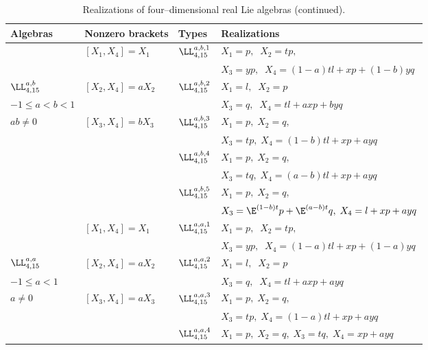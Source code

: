 \setcounter{table}{1}
\begin{table}
\label{t7}
\caption{Realizations of four--dimensional real Lie algebras (continued).}
\begin{center}
\begin{tabular}{|l|l|l|l|}
\hline
Algebras & Nonzero brackets & Types & Realizations\\
\hline
& $[X_1,X_4]=X_1$& $\LL_{4,15}^{a,b,1}$ & $X_1=p,\;\;X_2=tp,$\\
& &  &                                 $ X_3=yp,\;\;X_4=(1-a)tl+xp+(1-b)yq$\\
\cline{3-4}
$\LL_{4,15}^{a,b}$ & $[X_2,X_4]=aX_2$ & $\LL_{4,15}^{a,b,2}$ &
$X_1=l,\;\;X_2=p$\\
$-1\le a <b<1$ &   &   & $X_3=q,\;\;X_4=tl+axp+byq$\\
 \cline{3-4}
$ab\ne 0$ & $[X_3,X_4]=bX_3$ & $\LL_{4,15}^{a,b,3}$ & $X_1=p,\;X_2=q,$\\
 &   &   & $X_3=tp,\;X_4=(1-b)tl+xp+ayq$\\
\cline{3-4}
&  & $\LL_{4,15}^{a,b,4}$ & $X_1=p,\;X_2=q,$\\
&   &    &  $X_3=tq,\;X_4=(a-b)tl+xp+ayq$\\
\cline{3-4}
&  & $\LL_{4,15}^{a,b,5}$ & $X_1=p,\;X_2=q,$\\ 
&  &  & $X_3=\E^{(1-b)t}p+\E^{(a-b)t}q,\;X_4=l+xp+ayq$\\
 \hline
& $[X_1,X_4]=X_1$& $\LL_{4,15}^{a,a,1}$ & $X_1=p,\;\;X_2=tp,$\\
& &  &                                 $ X_3=yp,\;\;X_4=(1-a)tl+xp+(1-a)yq$\\
\cline{3-4}
$\LL_{4,15}^{a,a}$ & $[X_2,X_4]=aX_2$ & $\LL_{4,15}^{a,a,2}$ &
$X_1=l,\;\;X_2=p$\\
$-1\le a <1$ &   &   & $X_3=q,\;\;X_4=tl+axp+ayq$\\
 \cline{3-4}
$a\ne 0$ & $[X_3,X_4]=aX_3$ & $\LL_{4,15}^{a,a,3}$ & $X_1=p,\;X_2=q,$\\
 &   &   & $X_3=tp,\;X_4=(1-a)tl+xp+ayq$\\
 \cline{3-4}
  &   & $\LL_{4,15}^{a,a,4}$ & $X_1=p,\;X_2=q,\;X_3=tq,\;X_4=xp+ayq$\\
\hline
\end{tabular}
\end{center}
\end{table}

\setcounter{table}{1}

